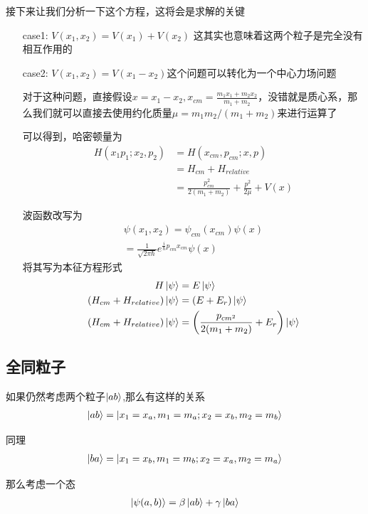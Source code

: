 \documentclass{article}
\begin{document}
接下来让我们分析一下这个方程，这将会是求解的关键
\begin{enumerate}
    \item[case1:] $V(x_1,x_2)=V(x_1)+V(x_2)$ 这其实也意味着这两个粒子是完全没有相互作用的
    \item[case2:] $V(x_1,x_2)=V(x_1-x_2)$这个问题可以转化为一个中心力场问题
    
    对于这种问题，直接假设$\displaystyle x=x_1-x_2,x_{cm}=\frac{m_1x_1+m_2x_2}{m_1+m_2}$，没错就是质心系，那么我们就可以直接去使用约化质量$\mu=m_1m_2/(m_1+m_2)$来进行运算了

    可以得到，哈密顿量为
    \begin{align*}
        H(x_1p_1;x_2,p_2)&=H(x_{cm},p_{cm};x,p)\\
        &=H_{cm}+H_{relative}\\
        &=\frac{p_{cm}^2}{2(m_1+m_2)}+\frac{p^2}{2\mu}+V(x)
    \end{align*}

    波函数改写为
    \begin{align*}
        \psi(x_1,x_2)=\psi_{cm}(x_{cm})\psi(x)\\
        =\frac{1}{\sqrt{2\pi\hbar}}e^{\frac{i}{\hbar}p_{cm}x_{cm}}\psi(x)
    \end{align*}
    将其写为本征方程形式
    \begin{align*}
        H\ket{\psi}&=E\ket{\psi}\\
        (H_{cm}+H_{relative})\ket{\psi}&=(E+E_r)\ket{\psi}\\
        (H_{cm}+H_{relative})\ket{\psi}&=\left(\frac{p_{cm^2}}{2(m_1+m_2)}+E_r\right)\ket{\psi}
    \end{align*}
\end{enumerate}


\subsection{全同粒子}
如果仍然考虑两个粒子$\ket{ab}$,那么有这样的关系
\begin{align*}
    \ket{ab}=\ket{x_1=x_a,m_1=m_a;x_2=x_b,m_2=m_b}
\end{align*}

同理
\begin{align*}
    \ket{ba}=\ket{x_1=x_b,m_1=m_b;x_2=x_a,m_2=m_a}
\end{align*}

那么考虑一个态
\begin{align*}
    \ket{\psi(a,b)}=\beta\ket{ab}+\gamma\ket{ba}
\end{align*}
\end{document}
